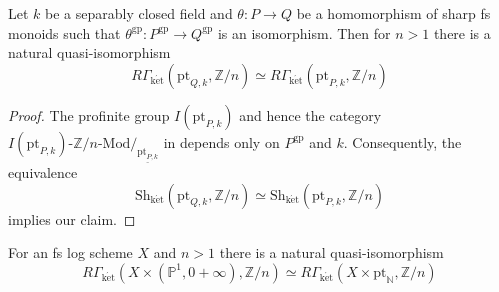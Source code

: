 \documentclass[10pt]{amsart}
\newcommand{\N}{\mathbb{N}}
\renewcommand{\P}{\mathbb{P}}
\newcommand{\Z}{\mathbb{Z}}
\newcommand{\gp}{\mathrm{gp}}
\newcommand{\ul}{\underline}
\newcommand{\ket}{\mathrm{k\acute{e}t}}
\newcommand{\Sh}{\mathrm{Sh}}
\newcommand{\pt}{\mathrm{pt}}
\begin{document}
\begin{lemma}\label{lem:toric2}
Let $k$ be a separably closed field and $\theta\colon P\to Q$ be a homomorphism of 
sharp fs monoids such that $\theta^\gp \colon P^{\gp} \to Q^{\gp}$ is an isomorphism.
Then for $n>1$ there is a natural quasi-isomorphism
$$R\Gamma_{\ket}(\pt_{Q,k}, \Z/n)\simeq R\Gamma_{\ket}(\pt_{P,k}, \Z/n)$$
\end{lemma}
\begin{proof}
The profinite group $I(\pt_{P,k})$ and hence the category 
$\text{$I(\pt_{P,k})$-$\Z/n$-Mod}/_{\ul{\pt_{P,k}}}$ in \cite[Proposition 4.6]{MR1457738} 
depends only on $P^\gp$ and $k$.
Consequently,
the equivalence 
\[
\Sh_\ket(\pt_{Q,k},\Z/n)
\simeq
\Sh_\ket(\pt_{P,k},\Z/n)
\]
implies our claim.
\end{proof}

\begin{lemma}
\label{lem:cohomology of log point}
For an fs log scheme $X$ and $n>1$ there is a natural quasi-isomorphism
\[
R\Gamma_\ket(X\times (\P^1,0+\infty),\Z/n)
\simeq
R\Gamma_\ket(X\times \pt_\N,\Z/n)
\]
\end{lemma}
\end{document}
